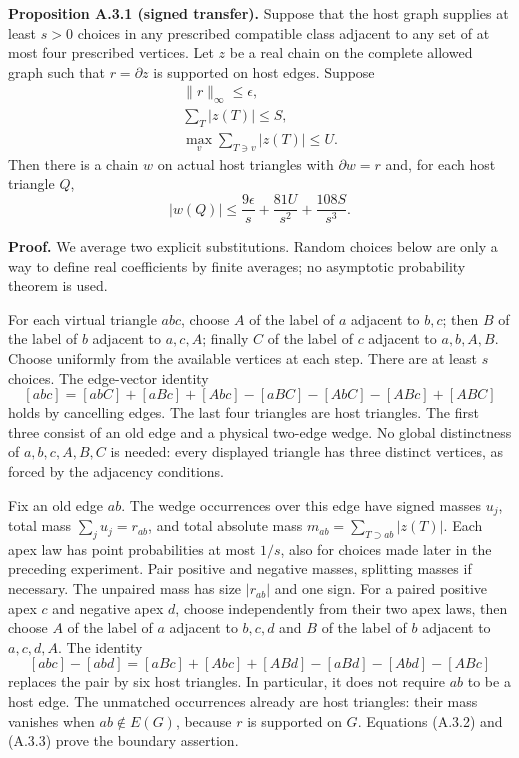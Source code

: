 \documentclass[english,11pt,a4paper]{article}
\begin{document}
\textbf{Proposition A.3.1 (signed transfer).} Suppose that the host graph supplies at least \(s>0\) choices in any prescribed compatible class adjacent to any set of at most four prescribed vertices. Let \(z\) be a real chain on the complete allowed graph such that \(r=\partial z\) is supported on host edges. Suppose \[\begin{gathered}
\|r\|_\infty\le\epsilon,\\
\sum_T|z(T)|\le S,\\
\max_v\sum_{T\ni v}|z(T)|\le U.
\end{gathered}\] Then there is a chain \(w\) on actual host triangles with \(\partial w=r\) and, for each host triangle \(Q\), \[|w(Q)|\le\frac{9\epsilon}{s}+
\frac{81U}{s^2}+\frac{108S}{s^3}.
\tag{A.3.1}\]

\textbf{Proof.} We average two explicit substitutions. Random choices below are only a way to define real coefficients by finite averages; no asymptotic probability theorem is used.

For each virtual triangle \(abc\), choose \(A\) of the label of \(a\) adjacent to \(b,c\); then \(B\) of the label of \(b\) adjacent to \(a,c,A\); finally \(C\) of the label of \(c\) adjacent to \(a,b,A,B\). Choose uniformly from the available vertices at each step. There are at least \(s\) choices. The edge-vector identity \[[abc]=[abC]+[aBc]+[Abc]-[aBC]-[AbC]-[ABc]+[ABC]
\tag{A.3.2}\] holds by cancelling edges. The last four triangles are host triangles. The first three consist of an old edge and a physical two-edge wedge. No global distinctness of \(a,b,c,A,B,C\) is needed: every displayed triangle has three distinct vertices, as forced by the adjacency conditions.

Fix an old edge \(ab\). The wedge occurrences over this edge have signed masses \(u_j\), total mass \(\sum_j u_j=r_{ab}\), and total absolute mass \(m_{ab}=\sum_{T\supset ab}|z(T)|\). Each apex law has point probabilities at most \(1/s\), also for choices made later in the preceding experiment. Pair positive and negative masses, splitting masses if necessary. The unpaired mass has size \(|r_{ab}|\) and one sign. For a paired positive apex \(c\) and negative apex \(d\), choose independently from their two apex laws, then choose \(A\) of the label of \(a\) adjacent to \(b,c,d\) and \(B\) of the label of \(b\) adjacent to \(a,c,d,A\). The identity \[[abc]-[abd]=
[aBc]+[Abc]+[ABd]-[aBd]-[Abd]-[ABc]
\tag{A.3.3}\] replaces the pair by six host triangles. In particular, it does not require \(ab\) to be a host edge. The unmatched occurrences already are host triangles: their mass vanishes when \(ab\notin E(G)\), because \(r\) is supported on \(G\). Equations (A.3.2) and (A.3.3) prove the boundary assertion.
\end{document}
